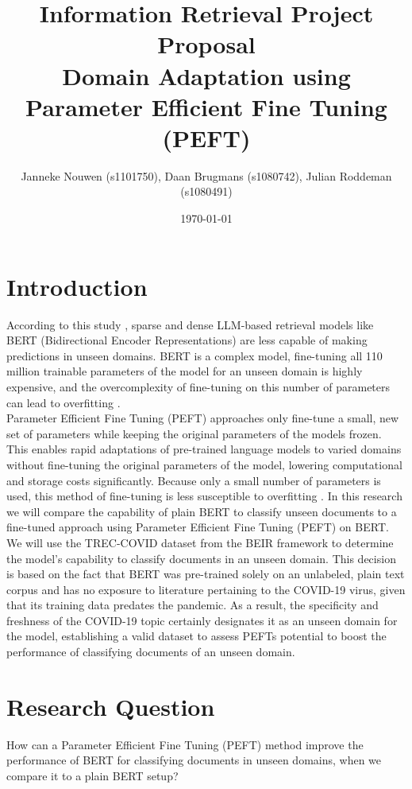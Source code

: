 \documentclass{IEEEtran}
\title{Information Retrieval Project Proposal \\ Domain Adaptation using Parameter Efficient Fine Tuning (PEFT)}
\author{Janneke Nouwen (s1101750), Daan Brugmans (s1080742), Julian Roddeman (s1080491)}
\date{\today}
\begin{document}
\maketitle

\section{Introduction}
According to this study \cite{thakur2021beir}, sparse and dense LLM-based retrieval models like BERT (Bidirectional Encoder Representations) are less capable of making predictions in unseen domains. BERT is a complex model, fine-tuning all 110 million trainable parameters of the model for an unseen domain is highly expensive, and the overcomplexity of fine-tuning on this number of parameters can lead to overfitting \cite{bejani2021systematic}. \\
Parameter Efficient Fine Tuning (PEFT) approaches only fine-tune a small, new set of parameters while keeping the original parameters of the models frozen. This enables rapid adaptations of pre-trained language models to varied domains without fine-tuning the original parameters of the model, lowering computational and storage costs significantly. Because only a small number of parameters is used, this method of fine-tuning is less susceptible to overfitting \cite{Soekhoe2016}.
In this research we will compare the capability of plain BERT to classify unseen documents to a fine-tuned approach using Parameter Efficient Fine Tuning (PEFT) on BERT. \\
We will use the TREC-COVID dataset from the BEIR framework \cite{thakur2021beir, voorhees2021trec} to determine the model's capability to classify documents in an unseen domain. This decision is based on the fact that BERT was pre-trained solely on an unlabeled, plain text corpus \cite{devlin2018bert} and has no exposure to literature pertaining to the COVID-19 virus, given that its training data predates the pandemic. As a result, the specificity and freshness of the COVID-19 topic certainly designates it as an unseen domain for the model, establishing a valid dataset to assess PEFTs potential to boost the performance of classifying documents of an unseen domain.

\section{Research Question}
How can a Parameter Efficient Fine Tuning (PEFT) method improve the performance of BERT for classifying documents in unseen domains, when we compare it to a plain BERT setup?
\end{document}
